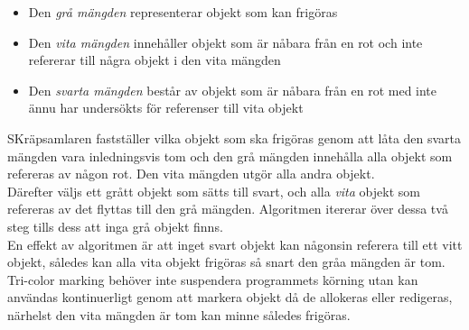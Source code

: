 \documentclass{article}
\begin{document}
\begin{itemize}
\item Den \textit{grå mängden} representerar objekt som kan frigöras\\
\item Den \textit{vita mängden} innehåller objekt som är nåbara från en rot och inte refererar till några objekt i den vita mängden\\
\item Den \textit{svarta mängden} består av objekt som är nåbara från en rot med inte ännu har undersökts för referenser till vita objekt\\
\end{itemize}
SKräpsamlaren fastställer vilka objekt som ska frigöras genom att låta den svarta mängden vara inledningsvis tom och den grå mängden innehålla alla objekt som refereras av någon rot. Den vita mängden utgör alla andra objekt. \newline
\\
Därefter väljs ett grått objekt som sätts till svart, och alla \textit{vita} objekt som refereras av det flyttas till den grå mängden. Algoritmen itererar över dessa två steg tills dess att inga grå objekt finns\cite{johnstone98}.\newline
\\
En effekt av algoritmen är att inget svart objekt kan någonsin referera till ett vitt objekt, således kan alla vita objekt frigöras så snart den gråa mängden är tom.  Tri-color marking behöver inte suspendera programmets körning utan kan användas kontinuerligt genom att markera objekt då de allokeras eller redigeras, närhelst den vita mängden är tom kan minne således frigöras.
\end{document}
